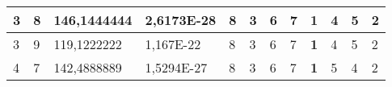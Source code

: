 \documentclass[conference]{IEEEtran}
\begin{document}
\begin{table*}[]
\begin{tabular}{|llll|llllllll|}
\multicolumn{1}{|l|}{3}                                                              & \multicolumn{1}{l|}{8}                                                                 & \multicolumn{1}{l|}{146,1444444}                                                           & 2,6173E-28                              & \multicolumn{1}{l|}{8}                                                           & \multicolumn{1}{l|}{3}                                                           & \multicolumn{1}{l|}{6}                                                           & \multicolumn{1}{l|}{7}                                                           & \multicolumn{1}{l|}{\textbf{1}}                                                  & \multicolumn{1}{l|}{4}                                                           & \multicolumn{1}{l|}{5}                                                           & 2                                   \\ \hline
\multicolumn{1}{|l|}{3}                                                              & \multicolumn{1}{l|}{9}                                                                 & \multicolumn{1}{l|}{119,1222222}                                                           & 1,167E-22                               & \multicolumn{1}{l|}{8}                                                           & \multicolumn{1}{l|}{3}                                                           & \multicolumn{1}{l|}{6}                                                           & \multicolumn{1}{l|}{7}                                                           & \multicolumn{1}{l|}{\textbf{1}}                                                  & \multicolumn{1}{l|}{4}                                                           & \multicolumn{1}{l|}{5}                                                           & 2                                   \\ \hline
\multicolumn{1}{|l|}{4}                                                              & \multicolumn{1}{l|}{7}                                                                 & \multicolumn{1}{l|}{142,4888889}                                                           & 1,5294E-27                              & \multicolumn{1}{l|}{8}                                                           & \multicolumn{1}{l|}{3}                                                           & \multicolumn{1}{l|}{6}                                                           & \multicolumn{1}{l|}{7}                                                           & \multicolumn{1}{l|}{\textbf{1}}                                                  & \multicolumn{1}{l|}{5}                                                           & \multicolumn{1}{l|}{4}                                                           & 2                                   \\ \hline

\end{tabular}
\end{table*}
\end{document}
